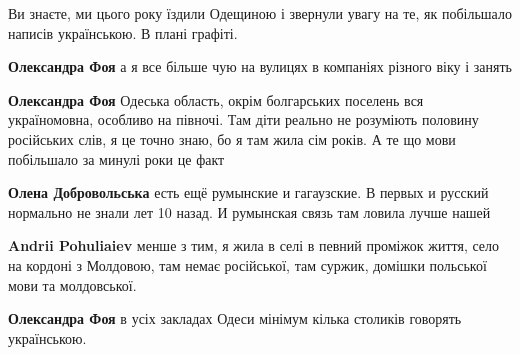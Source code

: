  
Ви знаєте, ми цього року їздили Одещиною і звернули увагу на те, як побільшало
написів українською. В плані графіті.

\begin{itemize}
 

\textbf{Олександра Фоя} а я все більше чую на вулицях в компаніях різного віку і занять

 
\textbf{Олександра Фоя} Одеська область, окрім болгарських поселень вся україномовна, особливо на півночі. Там діти реально не розуміють половину російських слів, я це точно знаю, бо я там жила сім років. А те що мови побільшало за минулі роки це факт

 
\textbf{Олена Добровольська} есть ещё румынские и гагаузские. В первых и русский нормально не знали лет 10 назад. И румынская связь там ловила лучше нашей

 
\textbf{Andrii Pohuliaiev} менше з тим, я жила в селі в певний проміжок життя, село на кордоні з Молдовою, там немає російської, там суржик, домішки польської мови та молдовської.

 
\textbf{Олександра Фоя} в усіх закладах Одеси мінімум кілька столиків говорять українською.
\end{itemize}

